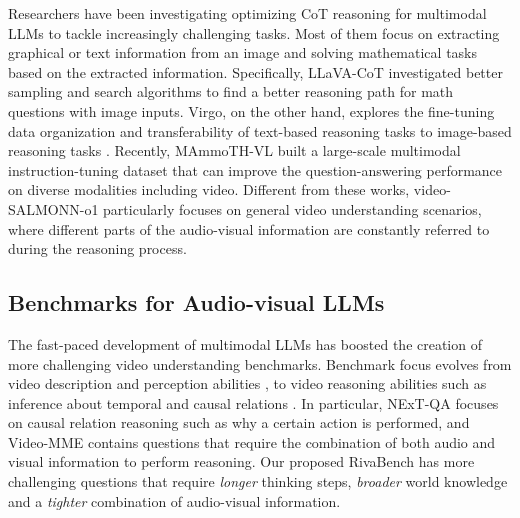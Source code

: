 Researchers have been investigating optimizing CoT reasoning for multimodal LLMs to tackle increasingly challenging tasks. Most of them focus on extracting graphical or text information from an image and solving mathematical tasks based on the extracted information. Specifically, LLaVA-CoT \cite{llavacot} investigated better sampling and search algorithms to find a better reasoning path for math questions with image inputs. Virgo, on the other hand, explores the fine-tuning data organization and transferability of text-based reasoning tasks to image-based reasoning tasks \cite{virgo}. Recently, MAmmoTH-VL \cite{mammothvl} built a large-scale multimodal instruction-tuning dataset that can improve the question-answering performance on diverse modalities including video. Different from these works, video-SALMONN-o1 particularly focuses on general video understanding scenarios, where different parts of the audio-visual information are constantly referred to during the reasoning process.



\subsection{Benchmarks for Audio-visual LLMs}


The fast-paced development of multimodal LLMs has boosted the creation of more challenging video understanding benchmarks. Benchmark focus evolves from video description and perception abilities \cite{2021value, AVSD2019, valor2023, musicAVQA2022, 2023vast, 2023videobench, 2023egoschema,pano-AVQA2021,avhallubench}, to video reasoning abilities such as inference about temporal and causal relations \cite{2021nextqa,2024mvbench,2023vitatecs,2024videomme,2024tempcompass,fang2024mmbench}. In particular, NExT-QA \cite{2021nextqa} focuses on causal relation reasoning such as why a certain action is performed, and Video-MME \cite{2024videomme} contains questions that require the combination of both audio and visual information to perform reasoning. Our proposed RivaBench has more challenging questions that require \textit{longer} thinking steps, \textit{broader} world knowledge and a \textit{tighter} combination of audio-visual information.


\vspace{-0.3cm}